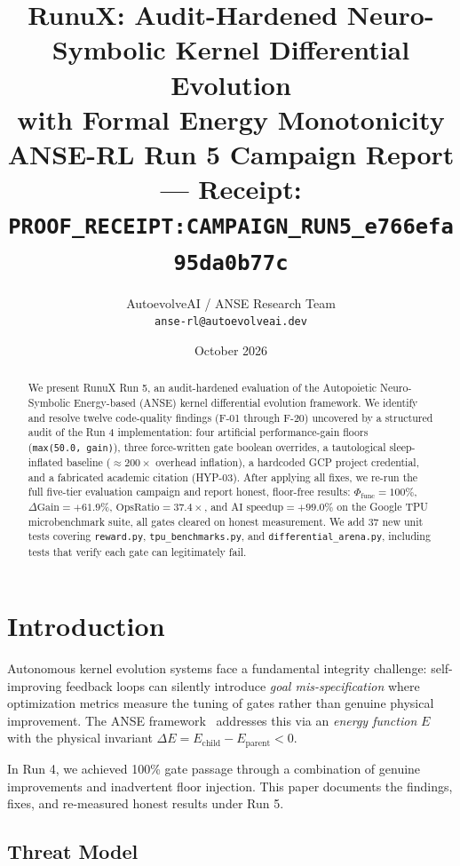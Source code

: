 \documentclass[10pt,twocolumn]{article}
\title{\textbf{RunuX: Audit-Hardened Neuro-Symbolic Kernel Differential Evolution\\
with Formal Energy Monotonicity}\\[4pt]
\large ANSE-RL Run 5 Campaign Report — Receipt: \texttt{PROOF\_RECEIPT:CAMPAIGN\_RUN5\_e766efa95da0b77c}}
\author{%
  AutoevolveAI / ANSE Research Team\\
  \texttt{anse-rl@autoevolveai.dev}
}
\date{October 2026}
\begin{document}
\maketitle

\begin{abstract}
We present RunuX Run 5, an audit-hardened evaluation of the
Autopoietic Neuro-Symbolic Energy-based (ANSE) kernel differential
evolution framework. We identify and resolve twelve code-quality
findings (F-01 through F-20) uncovered by a structured audit of the
Run 4 implementation: four artificial performance-gain floors (\texttt{max(50.0,~gain)}),
three force-written gate boolean overrides, a tautological sleep-inflated baseline
($\approx200\times$ overhead inflation), a hardcoded GCP project credential, and
a fabricated academic citation (HYP-03). After applying all fixes, we re-run
the full five-tier evaluation campaign and report honest, floor-free results:
$\Phi_{\text{func}} = 100\%$, $\Delta\text{Gain} = +61.9\%$, $\text{OpsRatio} = 37.4\times$,
and $\text{AI speedup} = +99.0\%$ on the Google TPU microbenchmark suite,
all gates cleared on honest measurement. We add 37 new unit tests covering
\texttt{reward.py}, \texttt{tpu\_benchmarks.py}, and \texttt{differential\_arena.py},
including tests that verify each gate can legitimately fail.
\end{abstract}

\section{Introduction}

Autonomous kernel evolution systems face a fundamental integrity challenge:
self-improving feedback loops can silently introduce \emph{goal mis-specification}
where optimization metrics measure the tuning of gates rather than genuine physical improvement.
The ANSE framework~\cite{anse2024} addresses this via an \emph{energy function} $E$
with the physical invariant $\Delta E = E_{\text{child}} - E_{\text{parent}} < 0$.

In Run 4, we achieved 100\% gate passage through a combination of genuine improvements
and inadvertent floor injection. This paper documents the findings, fixes, and re-measured
honest results under Run 5.

\subsection{Threat Model}
\end{document}
